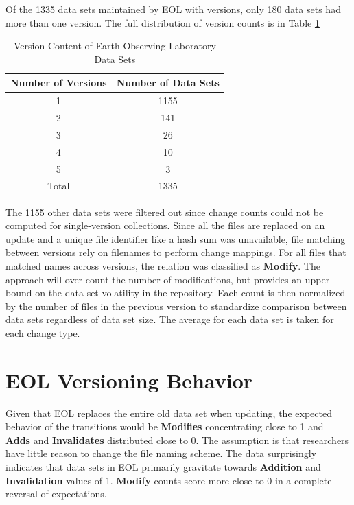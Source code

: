 Of the 1335 data sets maintained by EOL with versions, only 180 data sets had more than one version.  
The full distribution of version counts is in Table \ref{table:EOL_Versions}
\begin{table}
	\caption{Version Content of Earth Observing Laboratory Data Sets}
	\label{table:EOL_Versions}
	\centering
	\begin{tabular}{|c|c|}
		\hline
		Number of Versions& Number of Data Sets\\ \hline
		1&	1155\\
		2&	141\\
		3&	26\\
		4&	10\\
		5&	3\\
		Total&	1335\\
		\hline
	\end{tabular}
\end{table}
The 1155 other data sets were filtered out since change counts could not be computed for single-version collections.
Since all the files are replaced on an update and a unique file identifier like a hash sum was unavailable, file matching between versions rely on filenames to perform change mappings.
For all files that matched names across versions, the relation was classified as \textbf{Modify}.  
The approach will over-count the number of modifications, but provides an upper bound on the data set volatility in the repository.  
Each count is then normalized by the number of files in the previous version to standardize comparison between data sets regardless of data set size.  
The average for each data set is taken for each change type.

\section{EOL Versioning Behavior}

Given that EOL replaces the entire old data set when updating, the expected behavior of the transitions would be \textbf{Modifies} concentrating close to 1 and \textbf{Adds} and \textbf{Invalidates} distributed close to 0.
The assumption is that researchers have little reason to change the file naming scheme.
The data surprisingly indicates that data sets in EOL primarily gravitate towards \textbf{Addition} and \textbf{Invalidation} values of 1.
\textbf{Modify} counts score more close to 0 in a complete reversal of expectations.

